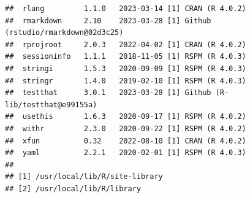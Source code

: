 \documentclass[
]{book}
\begin{document}
\begin{verbatim}
##  rlang         1.1.0   2023-03-14 [1] CRAN (R 4.0.2)                    
##  rmarkdown     2.10    2023-03-28 [1] Github (rstudio/rmarkdown@02d3c25)
##  rprojroot     2.0.3   2022-04-02 [1] CRAN (R 4.0.2)                    
##  sessioninfo   1.1.1   2018-11-05 [1] RSPM (R 4.0.3)                    
##  stringi       1.5.3   2020-09-09 [1] RSPM (R 4.0.3)                    
##  stringr       1.4.0   2019-02-10 [1] RSPM (R 4.0.3)                    
##  testthat      3.0.1   2023-03-28 [1] Github (R-lib/testthat@e99155a)   
##  usethis       1.6.3   2020-09-17 [1] RSPM (R 4.0.2)                    
##  withr         2.3.0   2020-09-22 [1] RSPM (R 4.0.2)                    
##  xfun          0.32    2022-08-10 [1] CRAN (R 4.0.2)                    
##  yaml          2.2.1   2020-02-01 [1] RSPM (R 4.0.3)                    
## 
## [1] /usr/local/lib/R/site-library
## [2] /usr/local/lib/R/library
\end{verbatim}
\end{document}
